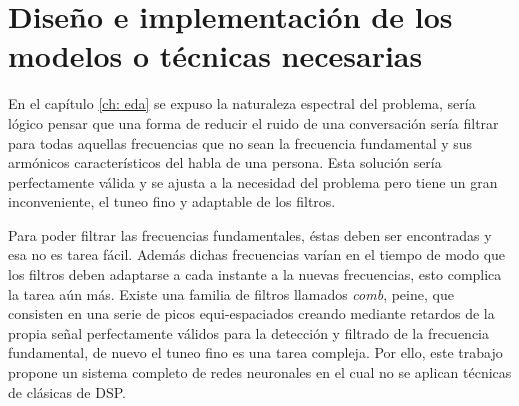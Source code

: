 \chapter{Diseño e implementación de los modelos o técnicas necesarias}\label{ch: modelDesign}
En el capítulo \ref{ch: eda} se expuso la naturaleza espectral del problema, sería lógico pensar que una forma de reducir el ruido de una conversación sería filtrar para todas aquellas frecuencias que no sean la frecuencia fundamental y sus armónicos característicos del habla de una persona. Esta solución sería perfectamente válida y se ajusta a la necesidad del problema pero tiene un gran inconveniente, el tuneo fino y adaptable de los filtros.

Para poder filtrar las frecuencias fundamentales, éstas deben ser encontradas y esa no es tarea fácil. Además dichas frecuencias varían en el tiempo de modo que los filtros deben adaptarse a cada instante a la nuevas frecuencias, esto complica la tarea aún más. Existe una familia de filtros llamados \textit{comb}, peine, que consisten en una serie de picos equi-espaciados creando mediante retardos de la propia señal perfectamente válidos para la detección y filtrado de la frecuencia fundamental\cite{1035730}, de nuevo el tuneo fino es una tarea compleja. Por ello, este trabajo propone un sistema completo de redes neuronales en el cual no se aplican técnicas de clásicas de \gls{DSP}.
